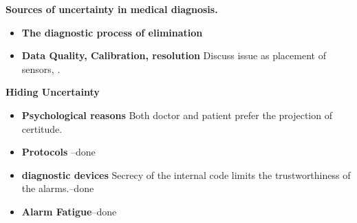 \documentclass[11pt]{article}
\begin{document}

{\bf Sources of uncertainty in medical diagnosis.}
\begin{itemize}
  \item{\bf The diagnostic process of elimination}
  \item{\bf Data Quality, Calibration, resolution} Discuss issue as placement of sensors, .
  \end{itemize}

 {\bf Hiding Uncertainty}
  \begin{itemize}
    \item {\bf Psychological reasons} Both doctor and patient prefer
      the projection of certitude.
    \item {\bf Protocols} --done
    \item {\bf diagnostic devices} Secrecy of the internal code limits
      the trustworthiness of the alarms.--done
    \item{\bf Alarm Fatigue}--done
  \end{itemize}
\end{document}
